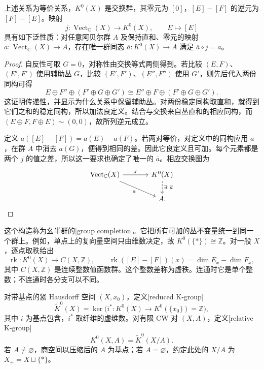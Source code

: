\begin{proposition}\label{g2:prop:k-group-completion}
	上述关系为等价关系，\(K^0(X)\) 是交换群，其零元为 \([0]\)，\([E]-[F]\) 的逆元为 \([F]-[E]\)。映射
	\[
		j:\operatorname{Vect}_{\mathbb C}(X)\longrightarrow K^0(X),\qquad E\longmapsto[E]
	\]
	具有如下泛性质：对任意阿贝尔群 \(A\) 及保持直和、零元的映射 \(a:\operatorname{Vect}_{\mathbb C}(X)\to A\)，存在唯一群同态 \(\overline a:K^0(X)\to A\) 满足 \(\overline a\circ j=a\)。
\end{proposition}
\begin{proof}
	自反性可取 \(G=0\)，对称性由交换等式两侧得到。若比较 \((E,F)\)、\((E',F')\) 使用辅助丛 \(G\)，比较 \((E',F')\)、\((E'',F'')\) 使用 \(G'\)，则先后代入两份同构可得
	\[
		E\oplus F''\oplus(F'\oplus G\oplus G')
		\cong E''\oplus F\oplus(F'\oplus G\oplus G').
	\]
	这证明传递性，并显示为什么关系中保留辅助丛。对两份稳定同构取直和，就得到它们之和的稳定同构，所以加法良定义。结合与交换来自丛直和的相应同构，而 \((E\oplus F,F\oplus E)\sim(0,0)\)，故所列逆元成立。

	定义 \(\overline a([E]-[F])=a(E)-a(F)\)。若两对等价，对定义中的同构应用 \(a\)，在群 \(A\) 中消去 \(a(G)\)，便得到相同的差。因此它良定义且可加。每个元素都是两个 \(j\) 的值之差，所以这一要求也确定了唯一的 \(\overline a\)。相应交换图为
	\[
		\begin{tikzcd}[column sep=large]
			\operatorname{Vect}_{\mathbb C}(X)\arrow[r,"j"]\arrow[dr,"a"']&K^0(X)\arrow[d,dashed,"\exists!\,\overline a"]\\
			&A.
		\end{tikzcd}
	\]
\end{proof}

这个构造称为幺半群的[group completion]。它把所有可加的丛不变量统一到同一个群上。例如，单点上的复向量空间只由维数决定，故 \(K^0(\{*\})\cong\mathbb Z\)。对一般 \(X\)，逐点取秩给出
\[
	\operatorname{rk}:K^0(X)\longrightarrow C(X,\mathbb Z),\qquad
	\operatorname{rk}([E]-[F])(x)=\dim E_x-\dim F_x,
\]
其中 \(C(X,\mathbb Z)\) 是连续整数值函数群。这个整数差称为虚秩。连通时它是单个整数；不连通时各分支可以不同。

\begin{definition}\label{g2:def:reduced-relative-k}
	对带基点的紧 Hausdorff 空间 \((X,x_0)\)，定义[reduced K-group]
	\[
		\widetilde K^0(X)=\ker\bigl(i^*:K^0(X)\longrightarrow K^0(\{x_0\})=\mathbb Z\bigr),
	\]
	其中 \(i\) 为基点包含，\(i^*\) 取纤维的虚维数。对有限 CW 对 \((X,A)\)，定义[relative K-group]
	\[
		K^0(X,A)=\widetilde K^0(X/A).
	\]
	若 \(A\ne\varnothing\)，商空间以压缩后的 \(A\) 为基点；若 \(A=\varnothing\)，约定此处的 \(X/A\) 为 \(X_+=X\sqcup\{*\}\)。
\end{definition}

